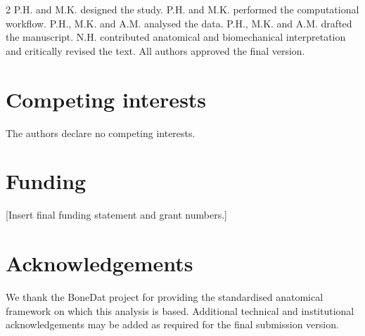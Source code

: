\documentclass[openacc]{rsproca_new}
\begin{document}
\begin{multicols}{2}
P.H. and M.K. designed the study. P.H. and M.K. performed the computational workflow. P.H., M.K. and A.M. analysed the data. P.H., M.K. and A.M. drafted the manuscript. N.H. contributed anatomical and biomechanical interpretation and critically revised the text. All authors approved the final version.

\section*{Competing interests}

The authors declare no competing interests.

\section*{Funding}

[Insert final funding statement and grant numbers.]

\section*{Acknowledgements}

We thank the BoneDat project for providing the standardised anatomical framework on which this analysis is based. Additional technical and institutional acknowledgements may be added as required for the final submission version.

\end{multicols}
\end{document}
